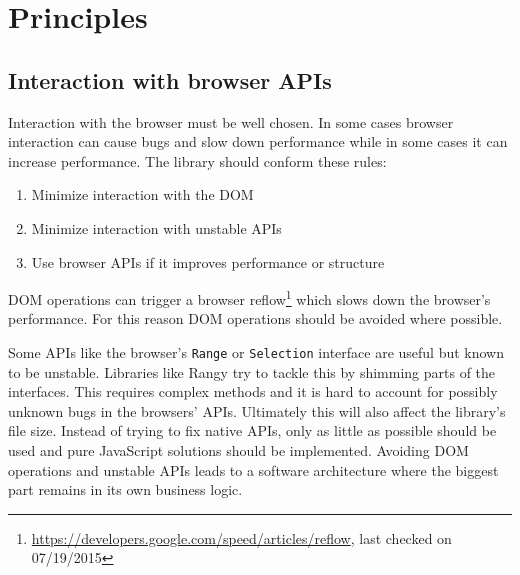 
\chapter{Principles}
\label{ch:concept_principles}

\section{Interaction with browser APIs}
\label{sec:interaction_with_browser_apis}

Interaction with the browser must be well chosen. In some cases browser interaction can cause bugs and slow down performance while in some cases it can increase performance. The library should conform these rules:

\begin{enumerate} 
\item Minimize interaction with the DOM
\item Minimize interaction with unstable APIs
\item Use browser APIs if it improves performance or structure
\end{enumerate}

DOM operations can trigger a browser reflow\footnote{\url{https://developers.google.com/speed/articles/reflow}, last checked on 07/19/2015} which slows down the browser's performance. For this reason DOM operations should be avoided where possible.

Some APIs like the browser's \texttt{Range} or \texttt{Selection} interface are useful but known to be unstable. Libraries like Rangy try to tackle this by shimming parts of the interfaces. This requires complex methods and it is hard to account for possibly unknown bugs in the browsers' APIs. Ultimately this will also affect the library's file size. Instead of trying to fix native APIs, only as little as possible should be used and pure JavaScript solutions should be implemented. Avoiding DOM operations and unstable APIs leads to a software architecture where the biggest part remains in its own business logic. %

